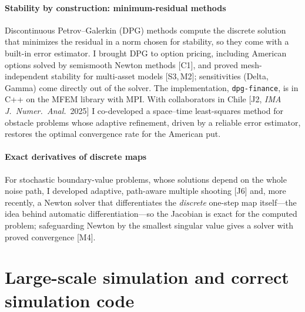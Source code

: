 \documentclass[11pt]{article}
\newcommand{\rc}[1]{\textcolor{accent}{[#1]}}
\begin{document}
\paragraph{Stability by construction: minimum-residual methods}
Discontinuous Petrov--Galerkin (DPG) methods compute the discrete solution
that minimizes the residual in a norm chosen for stability, so they come with
a built-in error estimator. I brought DPG to option pricing, including American
options solved by semismooth Newton methods \rc{C1}, and proved mesh-independent
stability for multi-asset models \rc{S3,\,M2}; sensitivities (Delta, Gamma)
come directly out of the solver. The implementation, \texttt{dpg-finance}, is
in C++ on the MFEM library with MPI. With collaborators in Chile
\rc{J2, \emph{IMA J.\ Numer.\ Anal.}\ 2025} I co-developed a space--time
least-squares method for obstacle problems whose adaptive refinement, driven by
a reliable error estimator, restores the optimal convergence rate for the
American put.

\paragraph{Exact derivatives of discrete maps}
For stochastic boundary-value problems, whose solutions depend on the whole
noise path, I developed adaptive, path-aware multiple shooting \rc{J6} and,
more recently, a Newton solver that differentiates the \emph{discrete}
one-step map itself---the idea behind automatic differentiation---so the
Jacobian is exact for the computed problem; safeguarding Newton by the
smallest singular value gives a solver with proved convergence \rc{M4}.

\section{Large-scale simulation and correct simulation code}
\end{document}
